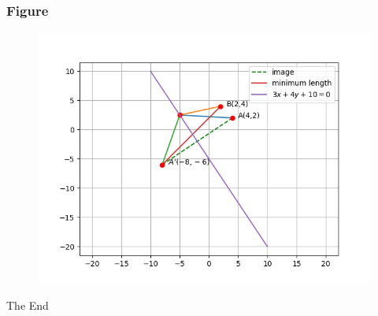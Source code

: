 \documentclass{beamer}
\begin{document}
\begin{frame}
\frametitle{Figure}
\begin{figure}
\includegraphics[width=0.8\linewidth]{lastpic.png}
\end{figure}
\end{frame}





\begin{frame}
\Huge{\centerline{The End}}
\end{frame}

\end{document}
